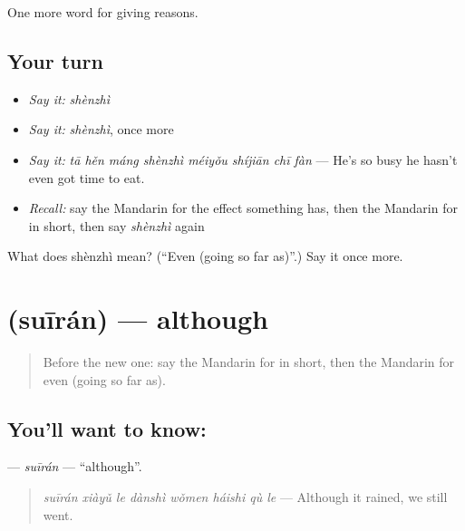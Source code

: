 \begin{grammarlens}[title={What you've built}]
One more word for giving reasons.
\end{grammarlens}

\subsection*{Your turn}
\begin{itemize}
\raggedright
  \item \emph{Say it:} \emph{shènzhì}
  \item \emph{Say it:} \emph{shènzhì}, once more
  \item \emph{Say it:} \emph{tā hěn máng shènzhì méiyǒu shíjiān chī fàn} — He's so busy he hasn't even got time to eat.
  \item \emph{Recall:} say the Mandarin for the effect something has, then the Mandarin for in short, then say \emph{shènzhì} again
\end{itemize}

\begin{tcolorbox}[breakable,colback=teal!4,colframe=teal!35!black,title={Before you move on}]
What does shènzhì mean? (\textquotedblleft{}Even (going so far as)\textquotedblright{}.) Say it once more.
\end{tcolorbox}
\section[\texorpdfstring{\zh{虽然} (suīrán)}{虽然 (suīrán)}]{ (suīrán) — although}

\label{lesson:ZH-C371-suiran}



\begin{quote}
Before the new one: say the Mandarin for in short, then the Mandarin for even (going so far as).
\end{quote}

\subsection*{You'll want to know: }
\textbf{} — \emph{suīrán} — \textquotedblleft{}although\textquotedblright{}.

\begin{quote}
\textbf{} \emph{suīrán xiàyǔ le dànshì wǒmen háishi qù le} — Although it rained, we still went.
\end{quote}

